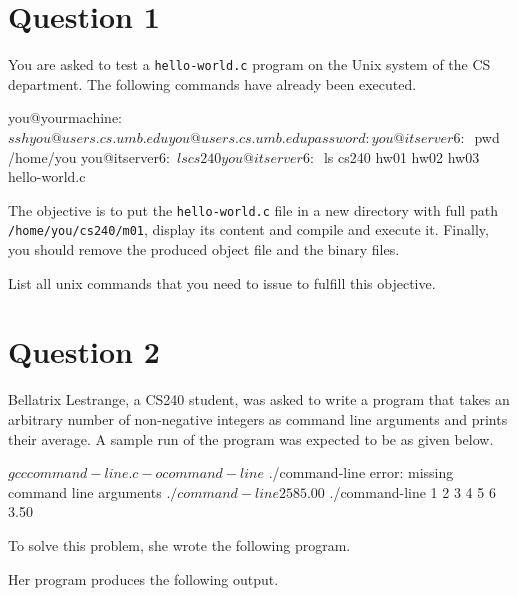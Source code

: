 \documentclass[12pt,letterpaper,twoside]{article}
\begin{document}


\section*{Question 1}

You are asked to test a \texttt{hello-world.c} program on the Unix system of the CS department.
The following commands have already been executed.

\begin{terminal}
you@yourmachine:~$ ssh you@users.cs.umb.edu
you@users.cs.umb.edu password:
you@itserver6:~$ pwd
/home/you
you@itserver6:~$ ls
cs240
you@itserver6:~$ ls cs240
hw01 hw02 hw03 hello-world.c
\end{terminal}

The objective is to put the \texttt{hello-world.c} file in a new directory with full path \texttt{/home/you/cs240/m01}, display its content and compile and execute it.
Finally, you should remove the produced object file and the binary files.

List all unix commands that you need to issue to fulfill this objective.

\newpage

\section*{Question 2}

Bellatrix Lestrange, a CS240 student, was asked to write a program that takes an arbitrary number of non-negative integers as command line arguments and prints their average.
A sample run of the program was expected to be as given below.

\begin{terminal}
$ gcc command-line.c -o command-line
$ ./command-line
error: missing command line arguments
$ ./command-line 2 5 8
5.00
$ ./command-line 1 2 3 4 5 6
3.50
\end{terminal}

To solve this problem, she wrote the following program.

\lstset{language=c,tabsize=4}


\newpage

Her program produces the following output.
\end{document}
